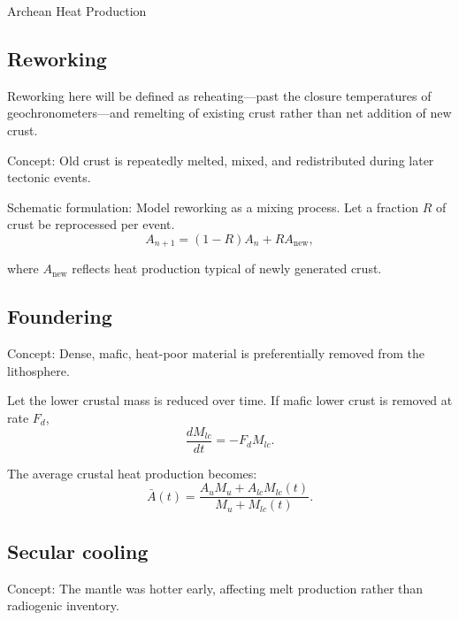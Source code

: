 \begin{activity}{Archean Heat Production}


\subsection*{Reworking}
Reworking here will be defined as reheating---past the closure temperatures of geochronometers---and remelting of existing crust rather than net addition of new crust.

Concept: Old crust is repeatedly melted, mixed, and redistributed during later tectonic events.

Schematic formulation: Model reworking as a mixing process.  Let a fraction $R$ of crust be reprocessed per event.
\[
A_{n+1} = (1 - R) A_n + R A_{\text{new}},
\]

where \(A_{\text{new}}\) reflects heat production typical of newly generated crust.



\subsection*{Foundering}
Concept: Dense, mafic, heat-poor material is preferentially removed from the lithosphere.

Let the lower crustal mass is reduced over time.  If mafic lower crust is removed at rate $F_d$,
\[
\frac{dM_{lc}}{dt} = -F_d M_{lc}.
\]

The average crustal heat production becomes:
\[
\bar{A}(t) = \frac{A_u M_u + A_{lc} M_{lc}(t)}{M_u + M_{lc}(t)}.
\]



\subsection*{Secular cooling}
Concept: The mantle was hotter early, affecting melt production rather than radiogenic inventory.


\end{activity}
